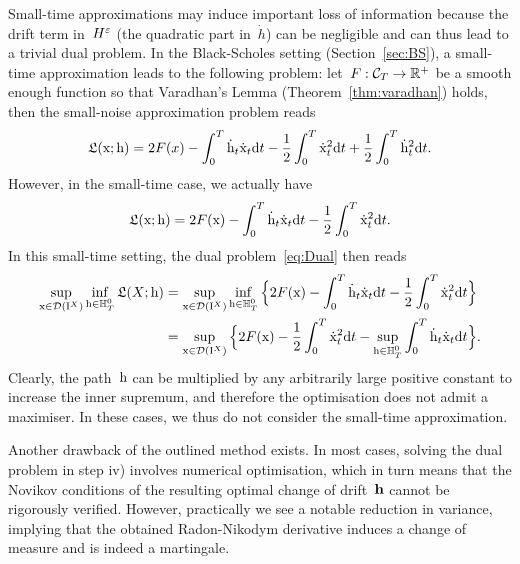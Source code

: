 \begin{remark}
Small-time approximations may induce important loss of information
because the drift term in~$H^\varepsilon$ (the quadratic part in~$\dot{h}$) can be negligible and can thus lead to a trivial dual problem. 
In the Black-Scholes setting (Section~\ref{sec:BS}),
a small-time approximation leads to the following problem: 
let~$F:\mathcal{C}_T\rightarrow\mathbb{R}^+$ be a smooth enough function so that Varadhan's Lemma (Theorem~\ref{thm:varadhan}) holds, then the small-noise approximation problem reads
$$
\mathfrak{L}(\mathrm{x};\mathrm{h}) = 2 F(x)  - \int_0^T\dot{\mathrm{h}}_t \dot{\mathrm{x}}_t\mathrm{d} t
- \frac{1}{2}\int_0^T\dot{\mathrm{x}}_t^2\mathrm{d} t
+ \frac{1}{2}\int_0^T\dot{\mathrm{h}}_t^2\mathrm{d} t.
$$
However, in the small-time case, we actually have
$$
\mathfrak{L}(\mathrm{x};\mathrm{h}) = 
2F(\mathrm{x}) - \int_0^T\dot{\mathrm{h}}_t \dot{\mathrm{x}}_t\mathrm{d} t
- \frac{1}{2}\int_0^T\dot{\mathrm{x}}_t^2\mathrm{d} t.
$$
In this small-time setting, the dual problem~\eqref{eq:Dual} then reads
\begin{align*}
\sup_{\mathrm{x}\in\mathcal{D}(\mathrm{I}^{X})}\inf_{\mathrm{h}\in\mathbb{H}^0_T} \mathfrak{L}(X;\mathrm{h})
 & = \sup_{\mathrm{x}\in \mathcal{D}(\mathrm{I}^{X})} \inf_{\mathrm{h}\in\mathbb{H}^0_T} \Big\{2F(\mathrm{x}) - \int_0^T\dot{\mathrm{h}}_t \dot{\mathrm{x}}_t\mathrm{d} t - \frac{1}{2}\int_0^T\dot{\mathrm{x}}_t^2\mathrm{d} t\Big\}\\
 & = \sup_{\mathrm{x}\in \mathcal{D}(\mathrm{I}^{X})} \Big\{2F(\mathrm{x})
 - \frac{1}{2}\int_0^T\dot{\mathrm{x}}_t^2\mathrm{d} t
 - \sup_{\mathrm{h}\in\mathbb{H}^0_T}\int_0^T\dot{\mathrm{h}}_t \dot{\mathrm{x}}_t\mathrm{d} t\Big\}.
\end{align*}
Clearly, the path~$\mathrm{h}$ can be multiplied by any arbitrarily large positive constant to increase the inner supremum, 
and therefore the optimisation does not admit a maximiser.
In these cases, we thus do not consider the small-time approximation.
\end{remark}
\begin{remark}
Another drawback of the outlined method exists. In most cases, solving the dual problem in step iv) involves numerical optimisation, which in turn means that the Novikov conditions of the resulting optimal change of drift~$\boldsymbol{\mathrm{h}}$ cannot be rigorously verified. However, practically we see a notable reduction in variance, implying that the obtained Radon-Nikodym derivative induces a change of measure and is indeed a martingale.
\end{remark}

